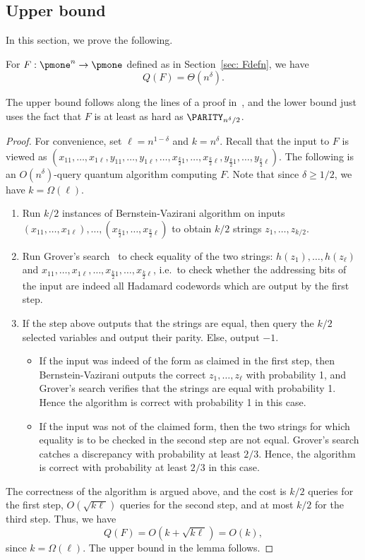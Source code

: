 \subsection{Upper bound}\label{sec: upper}
In this section, we prove the following.
\begin{claim}\label{claim: ndelta}
For $F: \pmone^{n} \to \pmone$ defined as in Section~\ref{sec: Fdefn}, we have
\[
Q(F) = \Theta(n^{\delta}).
\]
\end{claim}
The upper bound follows along the lines of a proof in~\cite{AdW14}, and the lower bound just uses the fact that $F$ is at least as hard as $\PARITY_{n^{\delta}/2}$.
\begin{proof}
For convenience, set $\ell = n^{1-\delta}$ and $k = n^{\delta}$.
Recall that the input to $F$ is viewed as $(x_{11},\ldots,x_{1\ell},y_{11},\ldots,y_{1\ell},\ldots,x_{\frac{k}{2}1},\ldots,x_{\frac{k}{2}\ell},y_{\frac{k}{2}1},\ldots,y_{\frac{k}{2}\ell})$. The following is an $O(n^\delta)$-query quantum algorithm computing $F$. Note that since $\delta \geq 1/2$, we have $k = \Omega(\ell)$.
\begin{enumerate}
    \item Run $k/2$ instances of Bernstein-Vazirani algorithm on inputs $(x_{11}, \dots, x_{1\ell}), \dots, (x_{\frac{k}{2}1}, \dots, x_{\frac{k}{2}\ell})$ to obtain $k/2$ strings $z_1, \dots, z_{k/2}$.
    \item Run Grover's search~\cite{Grover96, BHMT02} to check equality of the two strings: $h(z_1), \dots, h(z_\ell)$ and  $x_{11}, \dots, x_{1\ell}, \dots, x_{\frac{k}{2}1}, \dots, x_{\frac{k}{2}\ell}$, i.e.~to check whether the addressing bits of the input are indeed all Hadamard codewords which are output by the first step.
    \item If the step above outputs that the strings are equal, then query the $k/2$ selected variables and output their parity.  Else, output $-1$.
    \begin{itemize}
        \item If the input was indeed of the form as claimed in the first step, then Bernstein-Vazirani outputs the correct $z_1, \dots, z_\ell$ with probability 1, and Grover's search verifies that the strings are equal with probability 1.  Hence the algorithm is correct with probability 1 in this case.
        \item If the input was not of the claimed form, then the two strings for which equality is to be checked in the second step are not equal.  Grover's search catches a discrepancy with probability at least $2/3$.  Hence, the algorithm is correct with probability at least $2/3$ in this case.
        \end{itemize}
\end{enumerate}
The correctness of the algorithm is argued above, and the cost is $k/2$ queries for the first step, $O(\sqrt{k\ell})$ queries for the second step, and at most $k/2$ for the third step.
Thus, we have
\[
Q(F) = O(k + \sqrt{k\ell}) = O(k),
\]
since $k = \Omega(\ell)$.  The upper bound in the lemma follows.


\end{proof}
